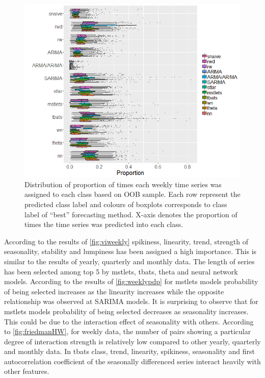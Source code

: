 \documentclass[11pt,a4paper,]{article}
\begin{document}
\begin{figure}
\centering
\includegraphics{figures/oobweekly-1.png}
\caption{\label{fig:oobweekly}Distribution of proportion of times each
weekly time series was assigned to each class based on OOB sample. Each
row represent the predicted class label and colours of boxplots
corresponds to class label of ``best'' forecasting method. X-axis
denotes the proportion of times the time series was predicted into each
class.}
\end{figure}

\clearpage

According to the results of \autoref{fig:viweekly} spikiness, linearity,
trend, strength of seasonality, stability and lumpiness has been
assigned a high importance. This is similar to the results of yearly,
quarterly and monthly data. The length of series has been selected among
top 5 by mstlets, tbats, theta and neural network models. According to
the results of \autoref{fig:weeklypdp} for mstlets models probability of
being selected increases as the linearity increases while the opposite
relationship was observed at SARIMA models. It is surprising to observe
that for mstlets models probability of being selected decreases as
seasonality increases. This could be due to the interaction effect of
seasonality with others. According to \autoref{fig:friedmanHW}, for
weekly data, the number of pairs showing a particular degree of
interaction strength is relatively low compared to other yearly,
quarterly and monthly data. In tbats class, trend, linearity, spikiness,
seasonality and first autocorrelation coefficient of the seasonally
differenced series interact heavily with other features.
\end{document}
